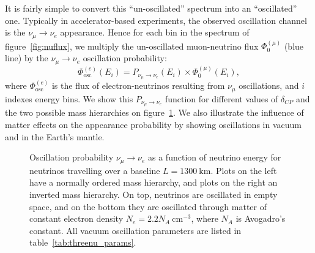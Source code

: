 It is fairly simple to convert this ``un-oscillated'' spectrum into an
``oscillated'' one. Typically in accelerator-based experiments, the observed oscillation channel
is the $\nu_\mu \rightarrow \nu_e$ appearance. Hence for each bin in the
spectrum of figure~\ref{fig:nuflux}, we multiply the un-oscillated
muon-neutrino flux
$\Phi^{(\mu)}_0$ (blue line) by the $\nu_\mu \rightarrow \nu_e$ oscillation
probability:
\begin{equation}
	\Phi^{(e)}_\text{osc} (E_i) = P_{\nu_\mu \rightarrow \nu_e} (E_i) \times
\Phi^{(\mu)}_0 (E_i),\label{eq:flux}\end{equation}
where $\Phi^{(e)}_\text{osc}$ is the flux of electron-neutrinos resulting from
$\nu_\mu$ oscillations, and $i$ indexes energy bins.
We show this $P_{\nu_\mu \rightarrow \nu_e}$ function for different values of
$\delta_{CP}$ and the two possible mass hierarchies on
figure~\ref{fig:dune_prob}. We also illustrate the influence of matter effects
on the appearance probability by showing oscillations in vacuum and in the
Earth's mantle.
\begin{figure}
	\centering
	\caption{Oscillation probability $\nu_\mu \rightarrow \nu_e$ as a function of
	neutrino energy for neutrinos travelling over a baseline $L=\SI{1300}{\km}$.
	Plots on the left have a normally ordered mass hierarchy, and plots on the
	right an inverted mass hierarchy. On top, neutrinos are oscillated in empty
	space, and on the bottom they are oscillated through matter of constant
	electron density $N_e=2.2 N_A~\si{\cm^{-3}}$, where $N_A$ is Avogadro's
	constant\cite{freund}. All vacuum oscillation parameters are
	listed in table~\ref{tab:threenu_params}.}
\label{fig:dune_prob}
\end{figure}


